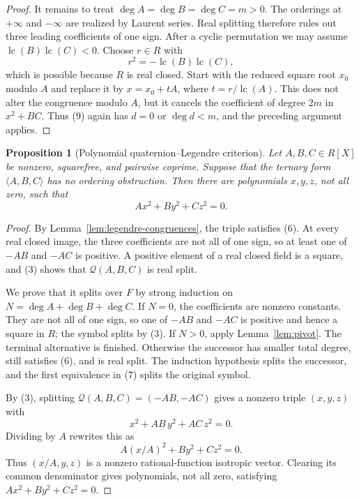 \documentclass[uplatex,dvipdfmx]{jsarticle}
\newtheorem{proposition}[theorem]{Proposition}
\theoremstyle{definition}
\theoremstyle{remark}
\begin{document}
\begin{proof}
It remains to treat
$\deg A=\deg B=\deg C=m>0$.  The orderings at $+\infty$ and $-\infty$ are
realized by Laurent series.  Real splitting therefore rules out three leading
coefficients of one sign.  After a cyclic permutation we may assume
$\operatorname{lc}(B)\operatorname{lc}(C)<0$.  Choose
$r\in R$ with
\[
  r^2=-\operatorname{lc}(B)\operatorname{lc}(C),
\]
which is possible because $R$ is real closed.  Start with the reduced square
root $x_0$ modulo $A$ and replace it by
$x=x_0+tA$, where
$t=r/\operatorname{lc}(A)$.  This does not alter the congruence modulo $A$,
but it cancels the coefficient of degree $2m$ in $x^2+BC$.  Thus (9) again
has $d=0$ or $\deg d<m$, and the preceding argument applies.
\end{proof}

\begin{proposition}[Polynomial quaternion--Legendre criterion]\label{prop:legendre}
Let $A,B,C\in R[X]$ be nonzero, squarefree, and pairwise coprime.  Suppose
that the ternary form $\langle A,B,C\rangle$ has no ordering obstruction.
Then there are polynomials $x,y,z$, not all zero, such that
\[
  Ax^2+By^2+Cz^2=0.
\]
\end{proposition}

\begin{proof}
By Lemma~\ref{lem:legendre-congruences}, the triple satisfies (6).  At every
real closed image, the three coefficients are not all of one sign, so at
least one of $-AB$ and $-AC$ is positive.  A positive element of a real
closed field is a square, and (3) shows that $\mathcal Q(A,B,C)$ is real
split.

We prove that it splits over $F$ by strong induction on
$N=\deg A+\deg B+\deg C$.  If $N=0$, the coefficients are nonzero constants.
They are not all of one sign, so one of $-AB$ and $-AC$ is positive and
hence a square in $R$; the symbol splits by (3).  If $N>0$, apply
Lemma~\ref{lem:pivot}.  The terminal alternative is finished.  Otherwise the
successor has smaller total degree, still satisfies (6), and is real split.
The induction hypothesis splits the successor, and the first equivalence in
(7) splits the original symbol.

By (3), splitting $\mathcal Q(A,B,C)=(-AB,-AC)$ gives a nonzero triple
$(x,y,z)$ with
\[
 x^2+AB\,y^2+AC\,z^2=0.
\]
Dividing by $A$ rewrites this as
\[
 A(x/A)^2+B y^2+C z^2=0.
\]
Thus $(x/A,y,z)$ is a nonzero rational-function isotropic vector.  Clearing
its common denominator gives polynomials, not all zero, satisfying
$Ax^2+By^2+Cz^2=0$.
\end{proof}
\end{document}
